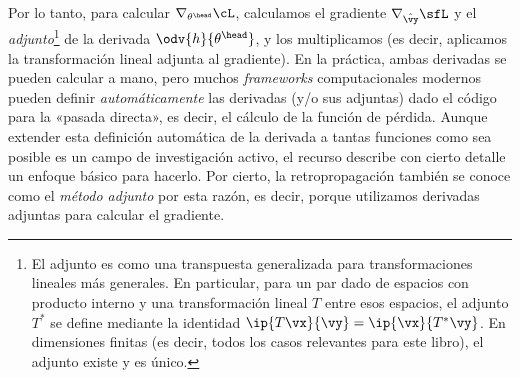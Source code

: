 \documentclass[../../book-main_es.tex]{subfiles}
\begin{document}
Por lo tanto, para calcular \(\nabla_{\theta^{\head}}\cL\), calculamos el
gradiente \(\nabla_{\hat{\vy}}\sfL\) y el
\textit{adjunto}\footnote{El adjunto es como una transpuesta generalizada
    para transformaciones lineales más generales. En particular, para un
    par dado de espacios con producto interno y una transformación lineal \(T\) entre
    esos espacios, el adjunto \(T^{*}\) se define mediante la identidad
    \(\ip{T\vx}{\vy} = \ip{\vx}{T^{*}\vy}\). En dimensiones finitas (es decir,
todos los casos relevantes para este libro), el adjunto existe y es único.} 
de la derivada \(\odv{h}{\theta^{\head}}\), y los multiplicamos (es decir,
aplicamos la transformación lineal adjunta al gradiente). En
la práctica, ambas derivadas se pueden calcular a mano, pero muchos
\textit{frameworks} computacionales modernos pueden definir \textit{automáticamente} las
derivadas (y/o sus adjuntas) dado el código para la «pasada
directa», es decir, el cálculo de la función de pérdida. Aunque extender esta
definición automática de la derivada a tantas funciones como sea posible es
un campo de investigación activo, el recurso \cite{bright2025matrix}
describe con cierto detalle un enfoque básico para hacerlo. Por cierto,
la retropropagación también se conoce como el \textit{método adjunto} por esta
razón, es decir, porque utilizamos derivadas adjuntas para calcular el gradiente.
\end{document}
